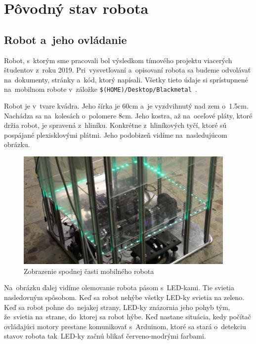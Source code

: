 \section{Pôvodný stav robota}

\subsection{Robot a~jeho ovládanie}

Robot, s~ktorým sme pracovali bol výsledkom tímového projektu viacerých študentov \newline z~roku 2019. Pri~vysvetľovaní a~opisovaní robota sa budeme
odvolávať na~dokumenty, stránky a~kód, ktorý napísali. Všetky tieto údaje si sprístupnené na~mobilnom robote v~záložke
\newline \texttt{\$(HOME)/Desktop/Blackmetal}~\cite{timovyProjekt}.

Robot je v~tvare kvádra. Jeho šírka je 60cm a~je vyzdvihnutý nad zem o~1.5cm. Nachádza sa na~kolesách o~polomere 8cm. Jeho kostra, až na~oceľové pláty,
ktoré držia robot, je spravená z~hliníku. Konkrétne z~hliníkových tyčí, ktoré sú pospájané plexisklovými plátmi. Jeho podobizeň vidíme na~nasledujúcom
obrázku.

\begin{figure}[!htbp]
	\begin{center}
		\includegraphics[width=0.95\textwidth]{img/robot.png}
	\end{center}
	\caption{Zobrazenie spodnej časti mobilného robota~\cite{timovyProjekt}}
	\label{fig:robot}
\end{figure}

\noindent Na~obrázku ďalej vidíme olemovanie robota pásom s~LED-kami. Tie svietia nasledovným spôsobom. Keď sa robot nehýbe všetky LED-ky svietia
na zeleno. Keď sa robot pohne do~nejakej strany, LED-ky znázornia jeho pohyb tým, že~svietia na~strane, do~ktorej sa robot hýbe. Keď nastane
situácia, kedy počítač ovládajúci motory prestane komunikovať s~Arduinom, ktoré sa stará o~detekciu stavov robota tak~LED-ky začnú blikať
červeno-modrými farbami.


